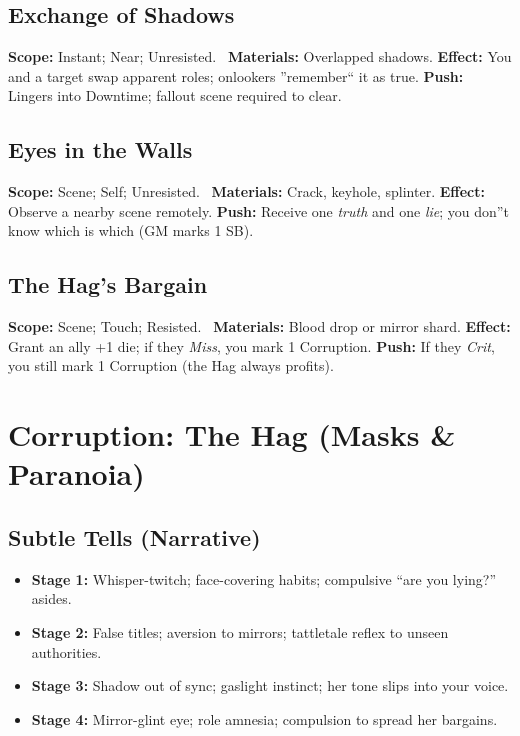 \documentclass[11pt]{article}
\begin{document}
\subsection{Exchange of Shadows}
\textbf{Scope:} Instant; Near; Unresisted. \ \textbf{Materials:} Overlapped shadows.  
\textbf{Effect:} You and a target swap apparent roles; onlookers ''remember`` it as true.  
\textbf{Push:} Lingers into Downtime; fallout scene required to clear.

\subsection{Eyes in the Walls}
\textbf{Scope:} Scene; Self; Unresisted. \ \textbf{Materials:} Crack, keyhole, splinter.  
\textbf{Effect:} Observe a nearby scene remotely.  
\textbf{Push:} Receive one \emph{truth} and one \emph{lie}; you don''t know which is which (GM marks 1 SB).

\subsection{The Hag's Bargain}
\textbf{Scope:} Scene; Touch; Resisted. \ \textbf{Materials:} Blood drop or mirror shard.  
\textbf{Effect:} Grant an ally +1 die; if they \emph{Miss}, you mark 1 Corruption.  
\textbf{Push:} If they \emph{Crit}, you still mark 1 Corruption (the Hag always profits).

\section{Corruption: The Hag (Masks \& Paranoia)}
\label{subsec:hag-corruption}

\subsection{Subtle Tells (Narrative)}
\begin{itemize}
  \item \textbf{Stage 1:} Whisper-twitch; face-covering habits; compulsive ``are you lying?'' asides.
  \item \textbf{Stage 2:} False titles; aversion to mirrors; tattletale reflex to unseen authorities.
  \item \textbf{Stage 3:} Shadow out of sync; gaslight instinct; her tone slips into your voice.
  \item \textbf{Stage 4:} Mirror-glint eye; role amnesia; compulsion to spread her bargains.
\end{itemize}
\end{document}
